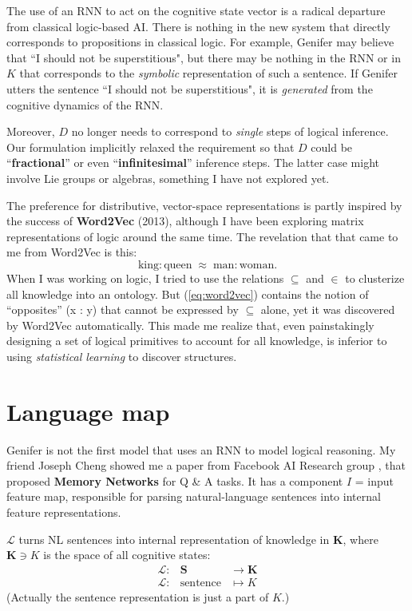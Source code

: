 \documentclass[12pt]{article}
\begin{document}
The use of an RNN to act on the cognitive state vector is a radical departure from classical logic-based AI.  There is nothing in the new system that directly corresponds to propositions in classical logic.  For example, Genifer may believe that ``I should not be superstitious", but there may be nothing in the RNN or in $K$ that corresponds to the \textit{symbolic} representation of such a sentence.  If Genifer utters the sentence ``I should not be superstitious", it is \textit{generated} from the cognitive dynamics of the RNN.

Moreover, $D$ no longer needs to correspond to \textit{single} steps of logical inference.  Our formulation implicitly relaxed the requirement so that $D$ could be ``\textbf{fractional}'' or even ``\textbf{infinitesimal}'' inference steps.  The latter case might involve Lie groups or algebras, something I have not explored yet.

The preference for distributive, vector-space representations is partly inspired by the success of \textbf{Word2Vec} (2013), although I have been exploring matrix representations of logic around the same time.  The revelation that that came to me from Word2Vec is this:
\begin{equation}
\label{eq:word2vec}
\mbox{king} : \mbox{queen} \;\approx\; \mbox{man} : \mbox{woman}.
\end{equation}
When I was working on logic, I tried to use the relations $\subseteq$ and $\in$ to clusterize all knowledge into an ontology.  But (\ref{eq:word2vec}) contains the notion of ``opposites'' (x : y) that cannot be expressed by $\subseteq$ alone, yet it was discovered by Word2Vec automatically.  This made me realize that, even painstakingly designing a set of logical primitives to account for all knowledge, is inferior to using \textit{statistical learning} to discover structures.

\section{Language map}

Genifer is not the first model that uses an RNN to model logical reasoning.  My friend Joseph Cheng showed me a paper from Facebook AI Research group \cite{Weston2015}, that proposed \textbf{Memory Networks} for Q \& A tasks.  It has a component $I$ = input feature map, responsible for parsing natural-language sentences into internal feature representations.

$\mathcal{L}$ turns NL sentences into internal representation of knowledge in $\mathbf{K}$, where $\mathbf{K} \ni K$ is the space of all cognitive states:
\begin{eqnarray}
\mathcal{L} :& \mathbf{S} & \rightarrow \mathbf{K} \nonumber \\
\mathcal{L} :& \mbox{sentence} & \mapsto K
\end{eqnarray}
(Actually the sentence representation is just a part of $K$.)
\end{document}
